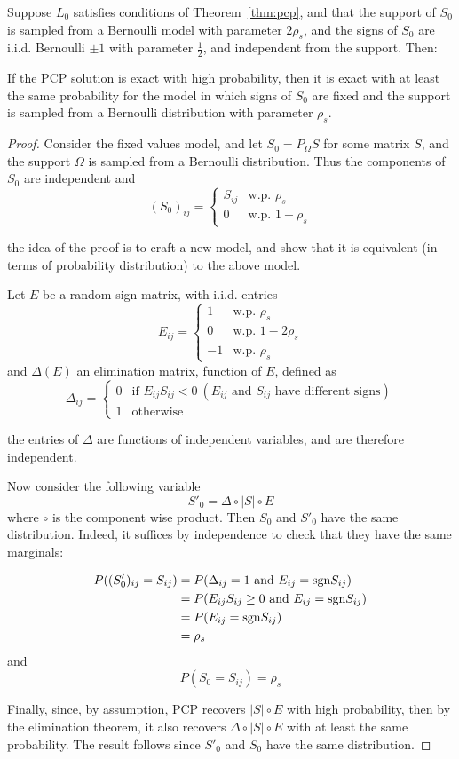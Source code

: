 \begin{theorem}
Suppose $L_0$ satisfies conditions of Theorem~\ref{thm:pcp}, and that the support of $S_0$ is sampled from a Bernoulli model with parameter $2\rho_s$, and the signs of $S_0$ are i.i.d. Bernoulli $\pm 1$ with parameter $\frac{1}{2}$, and independent from the support. Then:

If the PCP solution is exact with high probability, then it is exact with at least the same probability for the model in which signs of $S_0$ are fixed and the support is sampled from a Bernoulli distribution with parameter $\rho_s$.
\end{theorem}

\begin{proof}
Consider the fixed values model, and let $S_0 = P_\Omega S$ for some matrix $S$, and the support $\Omega$ is sampled from a Bernoulli distribution. Thus the components of $S_0$ are independent and
\[
(S_0)_{ij} =
\begin{cases}
S_{ij} & \text{w.p. } \rho_s \\
0 & \text{w.p. } 1 - \rho_s
\end{cases}
\]

the idea of the proof is to craft a new model, and show that it is equivalent (in terms of probability distribution) to the above model.

Let $E$ be a random sign matrix, with i.i.d. entries
\[
E_{ij} =
\begin{cases}
1 & \text{w.p. } \rho_s \\
0 & \text{w.p. } 1 - 2\rho_s\\
-1 & \text{w.p. } \rho_s
\end{cases}
\]
and $\Delta(E)$ an elimination matrix, function of $E$, defined as
\[
\Delta_{ij} =
\begin{cases}
0 & \text{if } E_{ij}S_{ij} < 0 \ (E_{ij} \text{ and } S_{ij} \text{ have different signs} )\\
1 & \text{otherwise}
\end{cases}
\]

the entries of $\Delta$ are functions of independent variables, and are therefore independent.

Now consider the following variable
\[
S'_0 = \Delta \circ |S| \circ E
\]
where $\circ$ is the component wise product. Then $S_0$ and $S'_0$ have the same distribution. Indeed, it suffices by independence to check that they have the same marginals:

\begin{align*}
P((S'_0)_{ij} = S_{ij})
&= P(\Delta_{ij} = 1 \text{ and } E_{ij} = \text{sgn} S_{ij}) \\
&= P(E_{ij}S_{ij} \geq 0 \text{ and } E_{ij} = \text{sgn} S_{ij}) \\
&= P(E_{ij} = \text{sgn} S_{ij}) \\
&= \rho_s
\end{align*}
and
\[
P(S_0 = S_{ij}) = \rho_s
\]

Finally, since, by assumption, PCP recovers $|S| \circ E$ with high probability, then by the elimination theorem, it also recovers $\Delta \circ |S| \circ E$ with at least the same probability. The result follows since $S'_0$ and $S_0$ have the same distribution.
\end{proof}


